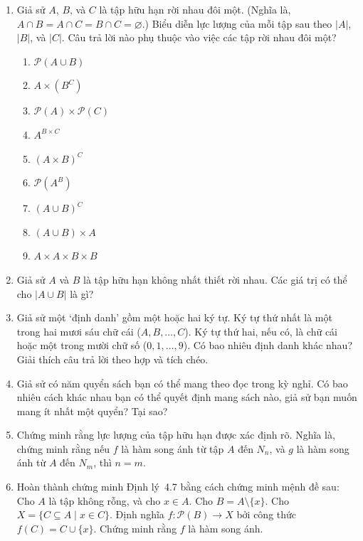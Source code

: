 \begin{enumerate}
\item[1.] Giả sử $A$, $B$, và $C$ là tập hữu hạn rời nhau đôi một. (Nghĩa là, $A \cap B = A \cap C = B \cap C = \varnothing$.) Biểu diễn lực lượng của mỗi tập sau theo $|A|$, $|B|$, và $|C|$. Câu trả lời nào phụ thuộc vào việc các tập rời nhau đôi một?
\begin{enumerate}[label=\alph*)]
\item $\mathcal{P}(A \cup B)$
\item $A \times (B^C)$
\item $\mathcal{P}(A) \times \mathcal{P}(C)$
\item $A^{B \times C}$
\item $(A \times B)^C$
\item $\mathcal{P}(A^B)$
\item $(A \cup B)^C$
\item $(A \cup B) \times A$
\item $A \times A \times B \times B$
\end{enumerate}

\item[2.] Giả sử $A$ và $B$ là tập hữu hạn không nhất thiết rời nhau. Các giá trị có thể cho $|A \cup B|$ là gì?

\item[3.] Giả sử một `định danh' gồm một hoặc hai ký tự. Ký tự thứ nhất là một trong hai mươi sáu chữ cái ($A, B, \ldots, C$). Ký tự thứ hai, nếu có, là chữ cái hoặc một trong mười chữ số ($0, 1, \ldots, 9$). Có bao nhiêu định danh khác nhau? Giải thích câu trả lời theo hợp và tích chéo.

\item[4.] Giả sử có năm quyển sách bạn có thể mang theo đọc trong kỳ nghỉ. Có bao nhiêu cách khác nhau bạn có thể quyết định mang sách nào, giả sử bạn muốn mang ít nhất một quyển? Tại sao?

\item[5.] Chứng minh rằng lực lượng của tập hữu hạn được xác định rõ. Nghĩa là, chứng minh rằng nếu $f$ là hàm song ánh từ tập $A$ đến $N_n$, và $g$ là hàm song ánh từ $A$ đến $N_m$, thì $n = m$.

\item[6.] Hoàn thành chứng minh Định lý~4.7 bằng cách chứng minh mệnh đề sau: Cho $A$ là tập không rỗng, và cho $x \in A$. Cho $B = A \setminus \{x\}$. Cho $X = \{C \subseteq A \mid x \in C\}$. Định nghĩa $f\colon \mathcal{P}(B) \to X$ bởi công thức $f(C) = C \cup \{x\}$. Chứng minh rằng $f$ là hàm song ánh.


\end{enumerate}

